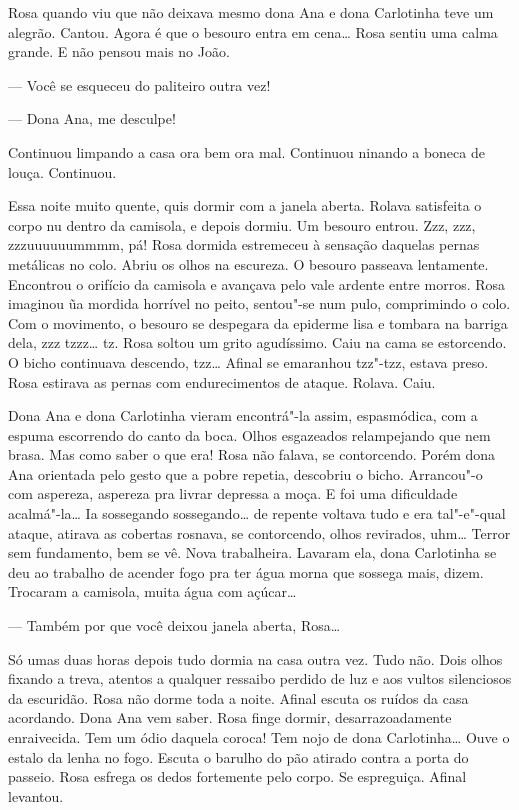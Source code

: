 \begin{linenumbers}
Rosa quando viu que não deixava mesmo dona Ana e dona Carlotinha teve um
alegrão. Cantou. Agora é que o besouro entra em cena\ldots{} Rosa sentiu uma
calma grande. E não pensou mais no João. 

--- Você se esqueceu do paliteiro outra vez!

--- Dona Ana, me desculpe!

Continuou limpando a casa ora bem ora mal. Continuou ninando a boneca de
louça. Continuou.

Essa noite muito quente, quis dormir com a janela aberta. Rolava
satisfeita o corpo nu dentro da camisola, e depois dormiu. Um besouro
entrou. Zzz, zzz, zzzuuuuuummmm, pá! Rosa dormida estremeceu à sensação
daquelas pernas metálicas no colo. Abriu os olhos na escureza. O besouro
passeava lentamente. Encontrou o orifício da camisola e avançava pelo
vale ardente entre morros. Rosa imaginou ũa mordida horrível no peito,
sentou"-se num pulo, comprimindo o colo. Com o movimento, o besouro se
despegara da epiderme lisa e tombara na barriga dela, zzz tzzz\ldots{} tz.
Rosa soltou um grito agudíssimo. Caiu na cama se estorcendo. O bicho
continuava descendo, tzz\ldots{} Afinal se emaranhou tzz"-tzz, estava preso.
Rosa estirava as pernas com endurecimentos de ataque. Rolava. Caiu.

Dona Ana e dona Carlotinha vieram encontrá"-la assim, espasmódica, com a
espuma escorrendo do canto da boca. Olhos esgazeados relampejando que
nem brasa. Mas como saber o que era! Rosa não falava, se contorcendo.
Porém dona Ana orientada pelo gesto que a pobre repetia, descobriu o
bicho. Arrancou"-o com aspereza, aspereza pra livrar depressa a moça. E
foi uma dificuldade acalmá"-la\ldots{} Ia sossegando sossegando\ldots{} de repente
voltava tudo e era tal"-e"-qual ataque, atirava as cobertas rosnava, se
contorcendo, olhos revirados, uhm\ldots{} Terror sem fundamento, bem se vê.
Nova trabalheira. Lavaram ela, dona Carlotinha se deu ao trabalho de
acender fogo pra ter água morna que sossega mais, dizem. Trocaram a
camisola, muita água com açúcar\ldots{}

--- Também por que você deixou janela aberta, Rosa\ldots{}

Só umas duas horas depois tudo dormia na casa outra vez. Tudo não. Dois
olhos fixando a treva, atentos a qualquer ressaibo perdido de luz e aos
vultos silenciosos da escuridão. Rosa não dorme toda a noite. Afinal
escuta os ruídos da casa acordando. Dona Ana vem saber. Rosa finge
dormir, desarrazoadamente enraivecida. Tem um ódio daquela coroca! Tem
nojo de dona Carlotinha\ldots{} Ouve o estalo da lenha no fogo. Escuta o
barulho do pão atirado contra a porta do passeio. Rosa esfrega os dedos
fortemente pelo corpo. Se espreguiça. Afinal levantou.


\end{linenumbers}
